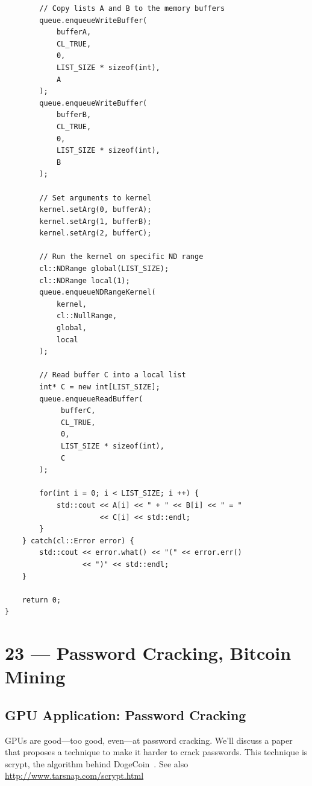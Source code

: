 \documentclass[a4paper]{report}
\begin{document}
\begin{lstlisting}
        // Copy lists A and B to the memory buffers
        queue.enqueueWriteBuffer(
            bufferA,
            CL_TRUE,
            0,
            LIST_SIZE * sizeof(int),
            A
        );
        queue.enqueueWriteBuffer(
            bufferB,
            CL_TRUE,
            0,
            LIST_SIZE * sizeof(int),
            B
        );
 
        // Set arguments to kernel
        kernel.setArg(0, bufferA);
        kernel.setArg(1, bufferB);
        kernel.setArg(2, bufferC);

        // Run the kernel on specific ND range
        cl::NDRange global(LIST_SIZE);
        cl::NDRange local(1);
        queue.enqueueNDRangeKernel(
            kernel,
            cl::NullRange,
            global,
            local
        );
 
        // Read buffer C into a local list
        int* C = new int[LIST_SIZE];
        queue.enqueueReadBuffer(
             bufferC,
             CL_TRUE,
             0,
             LIST_SIZE * sizeof(int),
             C
        );

        for(int i = 0; i < LIST_SIZE; i ++) {
            std::cout << A[i] << " + " << B[i] << " = "
                      << C[i] << std::endl;
        }
    } catch(cl::Error error) {
        std::cout << error.what() << "(" << error.err()
                  << ")" << std::endl;
    }
 
    return 0;
}
\end{lstlisting}









\chapter*{23 --- Password Cracking, Bitcoin Mining}


\section*{GPU Application: Password Cracking}

GPUs are good---too good, even---at password cracking. We'll discuss a paper
that proposes a technique to make it harder to crack passwords. This technique
is scrypt, the algorithm behind DogeCoin~\cite{scrypt}. See also \url{http://www.tarsnap.com/scrypt.html}
\end{document}
